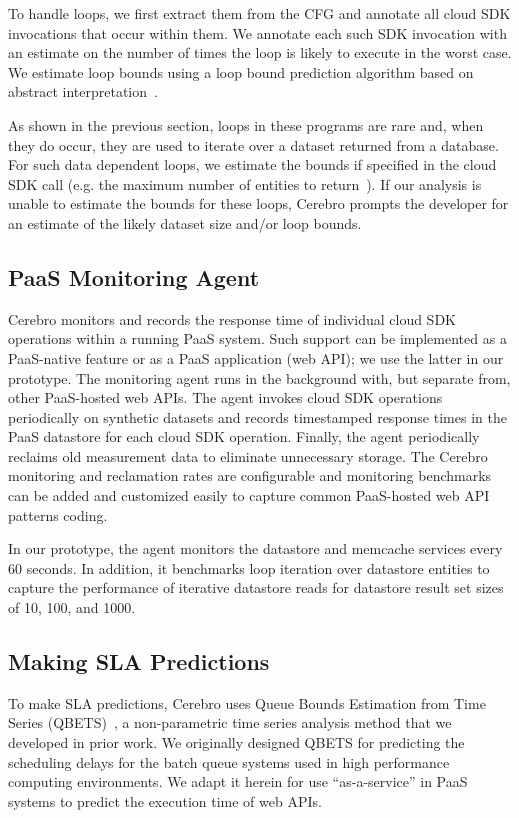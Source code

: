 To handle loops, we first extract them from the CFG and 
annotate all cloud SDK invocations that occur within them.
We annotate each such SDK invocation with an estimate on the number of times
the loop is likely to execute in the worst case. 
We estimate loop bounds using a loop bound prediction algorithm 
based on abstract interpretation~\cite{bygde2010static}. 

As shown in the previous section, loops in these programs 
are rare and, when they do occur, they are
used to iterate over a dataset returned from a database.
For such data dependent loops, we estimate the bounds if specified 
in the cloud SDK call (e.g. the maximum number of 
entities to return~\cite{gae-fetch-options}).
If our analysis is unable to estimate the bounds for these loops, Cerebro prompts
the developer for an estimate of the likely dataset size and/or loop bounds.

\subsection{PaaS Monitoring Agent}
Cerebro monitors and records the response time of individual
cloud SDK operations within a running PaaS system.  Such support can be 
implemented as a PaaS-native feature or as
a PaaS application (web API); we use the latter in our prototype.
The monitoring agent runs in the background with, but separate from, 
other PaaS-hosted web APIs.
The agent invokes cloud SDK operations periodically on synthetic datasets and 
records timestamped response times in the PaaS datastore for each cloud SDK
operation.
Finally, the agent periodically reclaims old measurement data
to eliminate unnecessary storage. The Cerebro monitoring and reclamation 
rates are configurable and monitoring benchmarks can be added and customized
easily to capture common PaaS-hosted web API patterns coding.

In our prototype, the agent monitors the datastore and memcache services
every 60 seconds. In addition, it 
benchmarks loop iteration over datastore entities to capture
the performance of iterative datastore reads for datastore result set sizes 
of 10, 100, and 1000.

\subsection{Making SLA Predictions}
To make SLA predictions, Cerebro uses 
Queue Bounds Estimation from Time Series (QBETS)~\cite{Nurmi:2007:QQB:1791551.1791556},
a non-parametric time series analysis method that we developed in prior work.
We originally designed QBETS for
predicting the scheduling delays for the batch queue systems 
used in high performance computing environments. 
We adapt it herein for use ``as-a-service'' in PaaS systems 
to predict the execution time of web APIs.

